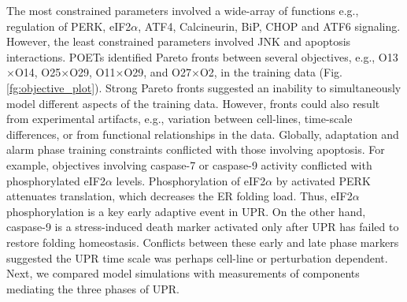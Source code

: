 \documentclass[fleqn,10pt]{wlscirep}
\begin{document}
The most constrained parameters involved a wide-array of functions e.g., regulation of PERK, eIF2$\alpha$, ATF4, Calcineurin, BiP, CHOP and ATF6 signaling.
However, the least constrained parameters involved JNK and apoptosis interactions.
POETs identified Pareto fronts between several objectives, e.g., O13$\times$O14, O25$\times$O29, O11$\times$O29, and O27$\times$O2, in the training data  (Fig. \ref{fg:objective_plot}).
Strong Pareto fronts suggested an inability to simultaneously model different aspects of the training data.
However, fronts could also result from experimental artifacts, e.g., variation between cell-lines, time-scale differences, or from functional relationships in the data.
Globally, adaptation and alarm phase training constraints conflicted with those involving apoptosis.
For example, objectives involving caspase-7 or caspase-9 activity conflicted with phosphorylated eIF2$\alpha$ levels.
Phosphorylation of eIF2$\alpha$ by activated PERK attenuates translation, which decreases the ER folding load.
Thus, eIF2$\alpha$ phosphorylation is a key early adaptive event in UPR. On the other hand, caspase-9 is a stress-induced death marker activated only after UPR has failed to restore folding homeostasis.
Conflicts between these early and late phase markers suggested the UPR time scale was perhaps cell-line or perturbation dependent. Next, we compared model simulations with measurements of components mediating the three phases of UPR.

\end{document}
